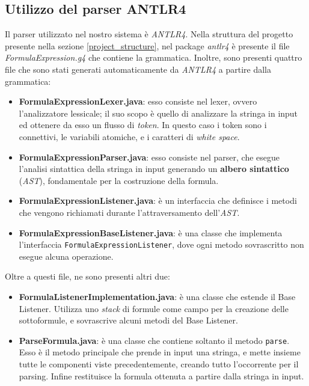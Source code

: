 \documentclass[a4paper,12pt]{report}
\begin{document}
\subsection{Utilizzo del parser ANTLR4}
Il parser utilizzato nel nostro sistema è \emph{ANTLR4}. Nella struttura del progetto presente nella sezione \ref{project_structure}, nel package \emph{antlr4} è presente il file \emph{FormulaExpression.g4} che contiene la grammatica. Inoltre, sono presenti quattro file che sono stati generati automaticamente da \emph{ANTLR4} a partire dalla grammatica:
\begin{itemize}
    \item \textbf{FormulaExpressionLexer.java}:
    esso consiste nel lexer, ovvero l'analizzatore lessicale; il suo scopo è quello di analizzare la stringa in input ed ottenere da esso un flusso di \emph{token}. In questo caso i token sono i connettivi, le variabili atomiche, e i caratteri di \emph{white space}.
    \item \textbf{FormulaExpressionParser.java}:
    esso consiste nel parser, che esegue l'analisi sintattica della stringa in input generando un \textbf{albero sintattico} (\emph{AST}), fondamentale per la costruzione della formula.
    \item \textbf{FormulaExpressionListener.java}:
    è un interfaccia che definisce i metodi che vengono richiamati durante l'attraversamento dell'\emph{AST}.
    \item \textbf{FormulaExpressionBaseListener.java}:
    è una classe che implementa l'interfaccia \texttt{FormulaExpressionListener}, dove ogni metodo sovrascritto non esegue alcuna operazione.
\end{itemize}

Oltre a questi file, ne sono presenti altri due:
\begin{itemize}
    \item \textbf{FormulaListenerImplementation.java}:
    è una classe che estende il Base Listener. Utilizza uno \emph{stack} di formule come campo per la creazione delle sottoformule, e sovrascrive alcuni metodi del Base Listener.
    \item \textbf{ParseFormula.java}:
    è una classe che contiene soltanto il metodo \texttt{parse}. Esso è il metodo principale che prende in input una stringa, e mette insieme tutte le componenti viste precedentemente, creando tutto l'occorrente per il parsing. Infine restituisce la formula ottenuta a partire dalla stringa in input.
\end{itemize}
\end{document}
